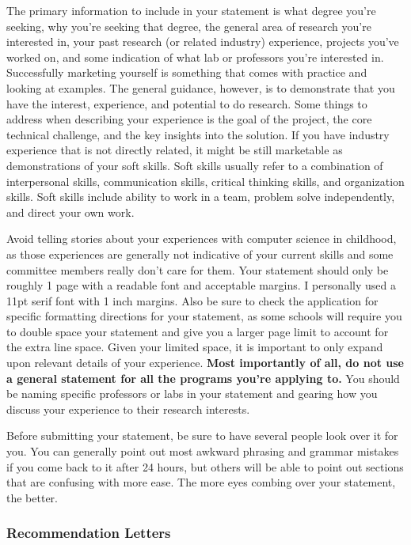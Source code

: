 \documentclass[12pt]{article}
\begin{document}
The primary information to include in your statement is what degree you're seeking, why you're seeking that degree, the general area of research you're interested in, your past research (or related industry) experience, projects you've worked on, and some indication of what lab or professors you're interested in. Successfully marketing yourself is something that comes with practice and looking at examples. The general guidance, however, is to demonstrate that you have the interest, experience, and potential to do research. \cite{mightgradguide} Some things to address when describing your experience is the goal of the project, the core technical challenge, and the key insights into the solution. \cite{mightgradguide} If you have industry experience that is not directly related, it might be still marketable as demonstrations of your soft skills. Soft skills usually refer to a combination of interpersonal skills, communication skills, critical thinking skills, and organization skills. \cite{cotesoftskills} Soft skills include ability to work in a team, problem solve independently, and direct your own work.

Avoid telling stories about your experiences with computer science in childhood, as those experiences are generally not indicative of your current skills and some committee members really don't care for them. \cite{mightgradguide,vasansop} Your statement should only be roughly 1 page with a readable font and acceptable margins. I personally used a 11pt serif font with 1 inch margins. Also be sure to check the application for specific formatting directions for your statement, as some schools will require you to double space your statement and give you a larger page limit to account for the extra line space. Given your limited space, it is important to only expand upon relevant details of your experience. \textbf{Most importantly of all, do not use a general statement for all the programs you're applying to.} You should be naming specific professors or labs in your statement and gearing how you discuss your experience to their research interests.

Before submitting your statement, be sure to have several people look over it for you. You can generally point out most awkward phrasing and grammar mistakes if you come back to it after 24 hours, but others will be able to point out sections that are confusing with more ease. The more eyes combing over your statement, the better.

\subsubsection{Recommendation Letters}
\end{document}

